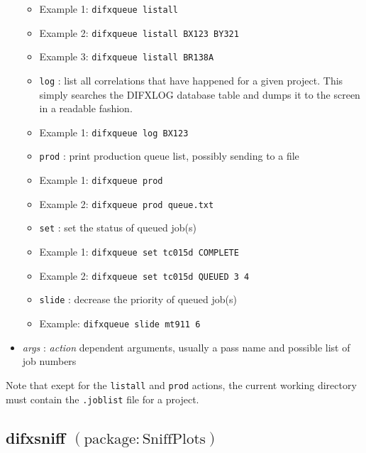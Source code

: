 \begin{itemize}
\begin{itemize}
\item[] Example 1: {\tt difxqueue listall}
\item[] Example 2: {\tt difxqueue listall BX123 BY321}
\item[] Example 3: {\tt difxqueue listall BR138A}
\vspace{5pt}
\item[] {\tt log} : list all correlations that have happened for a given project.  This simply searches the DIFXLOG database table and dumps it to the screen in a readable fashion.
\item[] Example 1: {\tt difxqueue log BX123}
\vspace{5pt}
\item[] {\tt prod} : print production queue list, possibly sending to a file
\item[] Example 1: {\tt difxqueue prod}
\item[] Example 2: {\tt difxqueue prod queue.txt}
\vspace{5pt}
\item[] {\tt set} : set the status of queued job(s)
\item[] Example 1: {\tt difxqueue set tc015d COMPLETE}
\item[] Example 2: {\tt difxqueue set tc015d QUEUED 3 4}
\vspace{5pt}
\item[] {\tt slide} : decrease the priority of queued job(s)
\item[] Example: {\tt difxqueue slide mt911 6}
\end{itemize}
\item[] {\em args} : {\em action} dependent arguments, usually a pass name and possible list of job numbers
\end{itemize}

Note that exept for the {\tt listall} and {\tt prod} actions, the current working directory must contain the {\tt .joblist} file for a project.







\subsection{difxsniff {\small $\mathrm{(package: SniffPlots)}$}} \label{sec:difxsniff}

